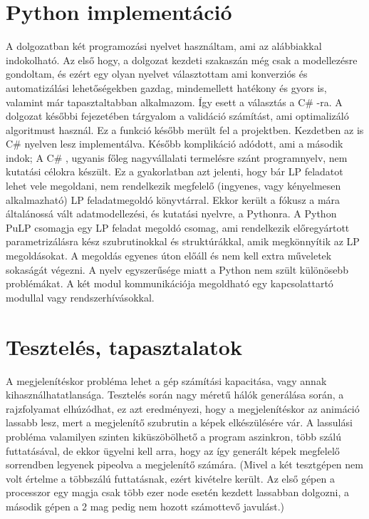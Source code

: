 \section{Python implementáció}
A dolgozatban két programozási nyelvet használtam, ami az alábbiakkal indokolható. Az első hogy, a dolgozat kezdeti szakaszán még csak a modellezésre gondoltam, és ezért egy olyan nyelvet választottam ami konverziós és automatizálási lehetőségekben gazdag, mindemellett hatékony és gyors is, valamint már tapasztaltabban alkalmazom. Így esett a választás a C\# -ra. A dolgozat későbbi fejezetében tárgyalom a validáció számítást, ami optimalizáló algoritmust használ. Ez a funkció később merült fel a projektben. Kezdetben az is C\# nyelven lesz implementálva. Később komplikáció adódott, ami a második indok; A C\# , ugyanis főleg nagyvállalati termelésre szánt programnyelv, nem kutatási célokra készült. Ez a gyakorlatban azt jelenti, hogy bár LP feladatot lehet vele megoldani, nem rendelkezik megfelelő (ingyenes, vagy kényelmesen alkalmazható) LP feladatmegoldó könyvtárral. Ekkor került a fókusz a mára általánossá vált adatmodellezési, és kutatási nyelvre, a Pythonra. A Python PuLP csomagja egy LP feladat megoldó csomag, ami rendelkezik előregyártott parametrizálásra kész szubrutinokkal és struktúrákkal, amik megkönnyítik az LP megoldásokat. A megoldás egyenes úton előáll és nem kell extra műveletek sokaságát végezni. A nyelv egyszerűsége miatt a Python nem szült különösebb problémákat. A két modul kommunikációja megoldható egy kapcsolattartó modullal vagy rendszerhívásokkal.

\section{Tesztelés, tapasztalatok}
A megjelenítéskor probléma lehet a gép számítási kapacitása, vagy annak kihasználhatatlansága. Tesztelés során nagy méretű hálók generálása során, a rajzfolyamat elhúzódhat, ez azt eredményezi, hogy a megjelenítéskor az animáció lassabb lesz, mert a megjelenítő szubrutin a képek elkészülésére vár. A lassulási probléma valamilyen szinten kiküszöbölhető a program aszinkron, több szálú futtatásával, de ekkor ügyelni kell arra, hogy az így generált képek megfelelő sorrendben legyenek pipeolva a megjelenítő számára. (Mivel a két tesztgépen nem volt értelme a többszálú futtatásnak, ezért kivételre került. Az első gépen a processzor egy magja csak több ezer node esetén kezdett lassabban dolgozni, a második gépen a 2 mag pedig nem hozott számottevő javulást.)

